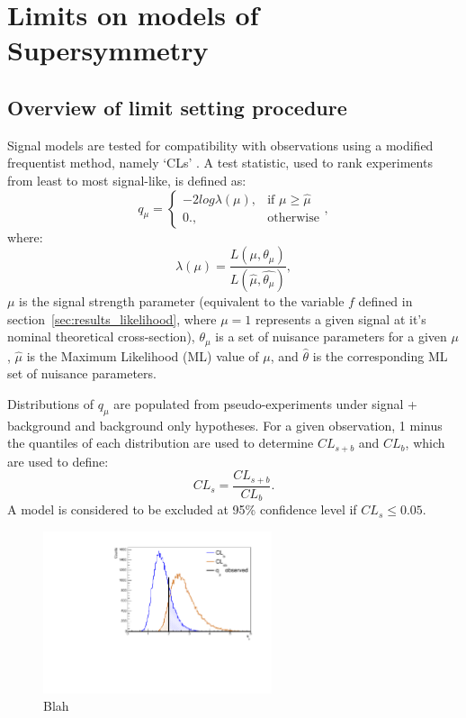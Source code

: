 \section{Limits on models of Supersymmetry}  %
\label{sec:interpretation_limits}

\subsection{Overview of limit setting procedure}
Signal models are tested for compatibility with observations using
a modified frequentist method, namely `CLs' \cite{alread-cls}. A test statistic,
used to rank
experiments from least to most signal-like, is defined as:
% 
\begin{equation}
q_{\mu} = \begin{cases} -2log\lambda(\mu), & \mbox{if } \mu \geq \hat{\mu} \\
0., & \mbox{otherwise} \end{cases},
\end{equation}
% 
where:
% 
\begin{equation}
\lambda(\mu) = \frac{L(\mu, \theta_{\mu})}{L(\hat{\mu}, \hat{\theta_{\mu}})},
\end{equation}
% 
$\mu$ is the signal strength parameter (equivalent to the variable $f$ defined
in section~\ref{sec:results_likelihood}, where $\mu=1$ represents a given
signal at it's nominal theoretical cross-section), $\theta_{\mu}$ is a set of
nuisance parameters for a given $\mu$, $\hat {\mu}$ is the Maximum Likelihood
(ML) value of $\mu$, and $\hat{\theta}$ is the corresponding ML set of nuisance
parameters.

Distributions of $q_{\mu}$ are populated from pseudo-experiments under
signal + background and background only hypotheses. For a given observation, 1
minus the quantiles of each distribution are used to determine $CL_{s+b}$ and
$CL_b$, which are used to define:
% 
\begin{equation}
CL_s = \frac{CL_{s+b}}{CL_b}.
\end{equation}
% 
A model is considered to be excluded at 95\% confidence level if
$CL_s \leq 0.05$.

\begin{figure}[t]
  \centering
  \includegraphics[width=0.6\textwidth]{Figs/other_limits/cartoon_cls_obs.pdf}
  \caption{Blah}
  \label{fig:cartoon_cls_obs}
\end{figure}

